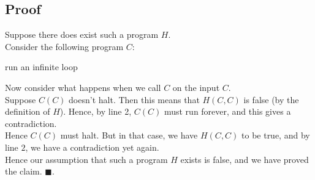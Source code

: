 \documentclass[a4paper]{article}
\newcommand{\nl}{\vspace{0.2cm}\\}
\begin{document}
\subsection{Proof}
Suppose there does exist such a program $H$.\nl
Consider the following program $C$:
\begin{algorithmic}[1]
            \State run an infinite loop
        \Else
            \State \Return
        \EndIf
    \EndFunction
\end{algorithmic}
Now consider what happens when we call $C$ on the input $C$.\nl
Suppose $C(C)$ doesn't halt. Then this means that $H(C, C)$ is false (by the definition of $H$).
Hence, by line 2, $C(C)$ must run forever, and this gives a contradiction.\nl
Hence $C(C)$ must halt. But in that case, we have $H(C, C)$ to be true, and by line $2$, we have a contradiction yet again.\nl
Hence our assumption that such a program $H$ exists is false, and we have proved the claim. $\blacksquare$.

\fi

\end{document}
